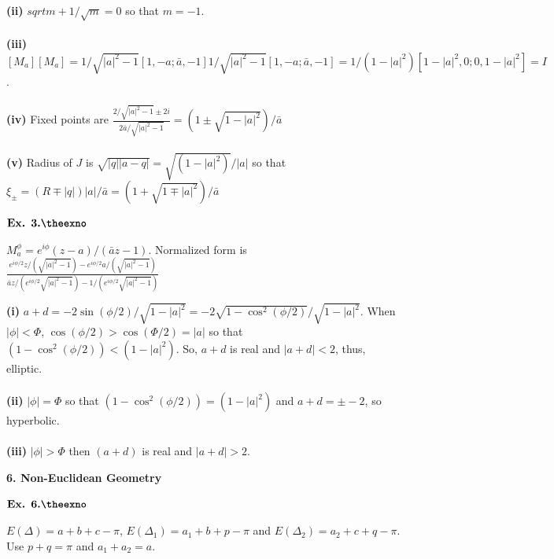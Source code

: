 \documentclass{article}
\def\tf{\textbf}
\newcounter{exno}
\begin{document}
\tf{(ii)} $sqrt{m}+1/\sqrt{m}=0$ so that $m = -1$.\\~\\

\tf{(iii)} $[M_a][M_a] = 1/\sqrt{|a|^2-1}[1,-a;\bar{a},-1]1/\sqrt{|a|^2-1}[1,-a;\bar{a},-1] = 1/(1-|a|^2)[1-|a|^2,0;0,1-|a|^2] = I$.\\~\\

\tf{(iv)} Fixed points are $\frac{2/\sqrt{|a|^2-1} \pm 2i}{2\bar{a}/\sqrt{|a|^2-1}} = (1 \pm \sqrt{1-|a|^2})/\bar{a}$\\~\\

\tf{(v)} Radius of $J$ is $\sqrt{|q||a-q|} = \sqrt{(1-|a|^2)}/|a|$ so that $\xi_{\pm} = (R\mp|q|)|a|/\bar{a} = (1+\sqrt{1\mp|a|^2})/\bar{a}$

\vspace{0.2in}

${\textbf{Ex. 3.\theexno}}$
\addtocounter{exno}{1}

$M_{a}^{\phi} = e^{i\phi}(z-a)/(\bar{a}z-1)$. Normalized form is $\frac{e^{i\phi/2}z/(\sqrt{|a|^2-1}) - e^{i\phi/2}a/(\sqrt{|a|^2-1})}{\bar{a}z/(e^{i\phi/2}\sqrt{|a|^2-1}) - 1/(e^{i\phi/2}\sqrt{|a|^2-1})}$

\tf{(i)} $a+d = -2\sin(\phi/2)/\sqrt{1-|a|^2} = -2\sqrt{1-\cos^2(\phi/2)}/\sqrt{1-|a|^2}$. When $|\phi|<\Phi$, $\cos(\phi/2) > \cos(\Phi/2) = |a|$ so that $(1-\cos^2(\phi/2)) < (1-|a|^2)$. So, $a+d$ is real and $|a+d| < 2$, thus, elliptic.\\~\\

\tf{(ii)} $|\phi| = \Phi$ so that $(1-\cos^2(\phi/2)) = (1-|a|^2)$ and $a+d = \pm -2$, so hyperbolic.\\~\\

\tf{(iii)} $|\phi|>\Phi$ then $(a+d)$ is real and $|a+d|>2$.

\vspace{0.2in}

\clearpage
\setcounter{exno}{1}

\begin{center}
    \textbf{\large{6. Non-Euclidean Geometry}}
\end{center}

${\textbf{Ex. 6.\theexno}}$
\addtocounter{exno}{1}

$E(\Delta) = a+b+c-\pi$, $E(\Delta_1) = a_1+b+p-\pi$ and $E(\Delta_2) = a_2+c+q-\pi$. Use $p+q = \pi$ and $a_1+a_2 = a$.\\~\\
\end{document}
